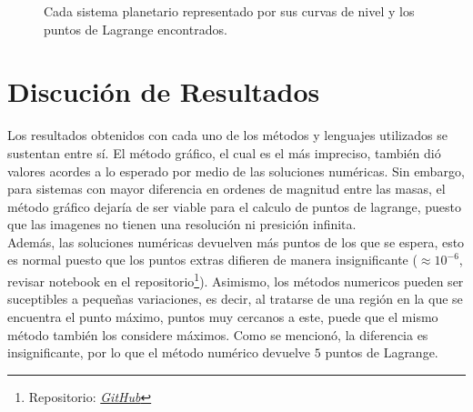 \begin{figure}[H]
\caption{Cada sistema planetario representado por sus curvas de nivel y los puntos de Lagrange encontrados.}
\label{superficie, cn, plane s-j}
\end{figure}



\section{Discución de Resultados}
\label{sec:discucion}

Los resultados obtenidos con cada uno de los métodos y lenguajes utilizados se sustentan entre sí. El método gráfico, el cual es el más impreciso, también dió valores acordes a lo esperado por medio de las soluciones numéricas. Sin embargo, para sistemas con mayor diferencia en ordenes de magnitud entre las masas, el método gráfico dejaría de ser viable para el calculo de puntos de lagrange, puesto que las imagenes no tienen una resolución ni presición infinita. \\

Además, las soluciones numéricas devuelven más puntos de los que se espera, esto es normal puesto que los puntos extras difieren de manera insignificante ($\approx 10^{-6}$, revisar notebook en el repositorio\footnote{Repositorio: \href{https://github.com/DSarceno/Semestre5/tree/main/Mecanica2/Proyecto/Informe}{\textit{GitHub}}}). Asimismo, los métodos numericos pueden ser suceptibles a pequeñas variaciones, es decir, al tratarse de una región en la que se encuentra el punto máximo, puntos muy cercanos a este, puede que el mismo método también los considere máximos. Como se mencionó, la diferencia es insignificante, por lo que el método numérico devuelve $5$ puntos de Lagrange.


